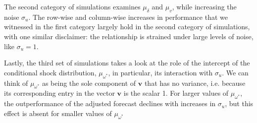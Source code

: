 \documentclass[11pt,3p,review,authoryear]{elsarticle}
\newcommand{\x}{\textbf{v}}
\theoremstyle{definition}
\begin{document}
The second category of simulations examines $\mu_{\delta}$ and $\mu_{v}$, while increasing the noise $\sigma_{u}$.  The row-wise and column-wise increases in performance that we witnessed in the first category largely hold in the second category of simulations, with one similar disclaimer: the relationship is strained under large levels of noise, like $\sigma_{u} = 1$.


Lastly, the third set of simulations takes a look at the role of the intercept of the conditional shock distribution, $\mu_{\omega^{*}}$, in particular, its interaction with $\sigma_{u}$.  We can think of $\mu_{\omega^{*}}$ as being the sole component of $\x$ that has no variance, i.e. because its corresponding entry in the vector $\x$ is the scalar 1.  For larger values of $\mu_{\omega^{*}}$, the outperformance of the adjusted forecast declines with increases in $\sigma_{u}$, but this effect is absent for smaller values of $\mu_{\omega^{*}}$ 
\end{document}
